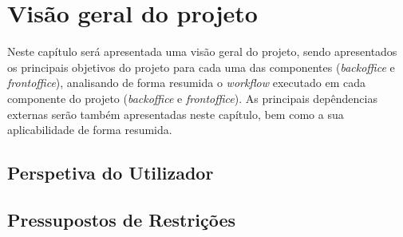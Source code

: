 \chapter{Visão geral do projeto}

Neste capítulo será apresentada uma visão geral do projeto, sendo apresentados os principais objetivos do projeto para cada uma das componentes (\textit{backoffice} e \textit{frontoffice}), analisando de forma resumida o \textit{workflow} executado em cada componente do projeto (\textit{backoffice} e \textit{frontoffice}). As principais depêndencias externas serão também apresentadas neste capítulo, bem como a sua aplicabilidade de forma resumida.



\section{Perspetiva do Utilizador}

\section{Pressupostos de Restrições}

